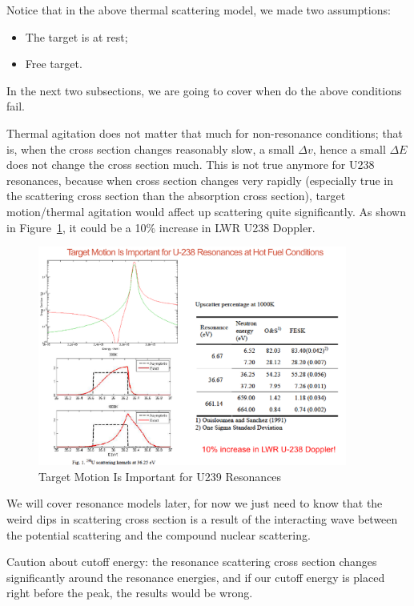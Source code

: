 \documentclass{school-22.211-notes}
\begin{document}
Notice that in the above thermal scattering model, we made two assumptions:
\begin{itemize}
\item The target is at rest;
\item Free target. 
\end{itemize}
In the next two subsections, we are going to cover when do the above conditions fail. 

Thermal agitation does not matter that much for non-resonance conditions; that is, when the cross section changes reasonably slow, a small $\Delta v$, hence a small $\Delta E$ does not change the cross section much. This is not true anymore for U238 resonances, because when cross section changes very rapidly (especially true in the scattering cross section than the absorption cross section), target motion/thermal agitation would affect up scattering quite significantly. As shown in Figure~\ref{timr}, it could be a 10\% increase in LWR U238 Doppler.  
\begin{figure}[ht]
  \centering
  \includegraphics[width=4in]{images/sl-d/target-in-motion-resonance.png}
  \caption{Target Motion Is Important for U239 Resonances} \label{timr}
\end{figure}
We will cover resonance models later, for now we just need to know that the weird dips in scattering cross section is a result of the interacting wave between the potential scattering and the compound nuclear scattering. 

Caution about cutoff energy: the resonance scattering cross section changes significantly around the resonance energies, and if our cutoff energy is placed right before the peak, the results would be wrong. 
\end{document}
